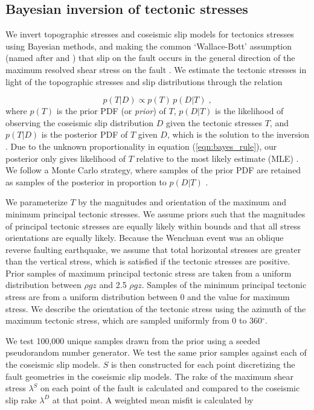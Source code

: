 \documentclass[draft,jgrga]{AGUTeX}
\begin{document}
\begin{article}
\subsection{Bayesian inversion of tectonic
stresses}\label{bayesian-inversion-of-tectonic-stresses}

We invert topographic stresses and coseismic slip models for tectonics
stresses using Bayesian methods, and making the common `Wallace-Bott'
assumption (named after \citet{wallace1951} and \citet{bott1959}) 
that slip on the fault occurs in the general direction
of the maximum resolved shear stress on the fault \citep[e.g.,][]
{mckenzie1969, angelier1994}. We estimate the tectonic stresses in
light of the topographic stresses and slip distributions through the
relation

\begin{equation} 
p(T|D) \propto p(T) \, p(D|T) \; , 
\label{eqn:bayes_rule} 
\end{equation}
where $p(T)$ is the prior PDF (or \emph{prior}) of $T$, $p(D|T)$ is the
likelihood of observing the coseismic slip distribution $D$ given the
tectonic stresses $T$, and $p(T|D)$ is the posterior PDF of $T$ given
$D$, which is the solution to the inversion \citep[e.g.,][]{mosegaard1995}.
Due to the unknown proportionality in equation (\ref{eqn:bayes_rule}),
our posterior only gives likelihood of $T$ relative to the most likely
estimate (MLE) \citep{tarantola2005}. We follow a Monte Carlo strategy,
where samples of the prior PDF are retained as samples of the posterior
in proportion to $p(D|T)$ \citep[e.g.,][]{mosegaard1995}.

We parameterize $T$ by the magnitudes and orientation of the maximum and
minimum principal tectonic stresses. We assume priors such that the
magnitudes of principal tectonic stresses are equally likely within
bounds and that all stress orientations are equally likely. Because the
Wenchuan event was an oblique reverse faulting earthquake, we assume
that total horizontal stresses are greater than the vertical stress,
which is satisfied if the tectonic stresses are positive. Prior samples
of maximum principal tectonic stress are taken from a uniform distribution
between $\rho g z$ and 2.5 $\rho g z$. Samples of the minimum principal
tectonic stress are from a uniform distribution between 0 and the value for
maximum stress. We describe the orientation of the tectonic stress using
the azimuth of the maximum tectonic stress, which are sampled uniformly
from 0 to 360$^{\circ}$.

We test 100,000 unique samples drawn from the prior using a seeded
pseudorandom number generator. We test the same prior samples against
each of the coseismic slip models. $S$ is then constructed for each
point discretizing the fault geometries in the coseismic slip models.
The rake of the maximum shear stress $\lambda^S$ on each point of the
fault is calculated and compared to the coseismic slip rake $\lambda^D$
at that point. A weighted mean misfit is calculated by


\end{article}
\end{document}
